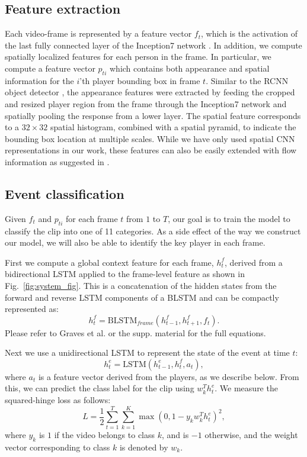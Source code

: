 \subsection{Feature extraction}
\label{sec:feature_extraction}
Each video-frame is represented by a feature vector $f_t$, which is the
activation of the last fully connected layer of the Inception7 network
\cite{Ioffe_arxiv15,Inception7}.  In addition, we compute spatially localized
features for each person in the frame. In particular, we compute a feature
vector $p_{ti}$ which contains both appearance and spatial information for the
$i$'th player bounding box in frame $t$.
Similar to the RCNN object
detector\cite{} , the appearance features were extracted by feeding the cropped
and resized player region from the frame through the Inception7 network and
spatially pooling the response from a lower layer. The spatial feature
corresponds to a $32\times 32$ spatial histogram, combined with a spatial pyramid, to
indicate the bounding box location at multiple scales.
While we have only used spatial CNN representations in our
work, these features can also be easily extended with flow information as
suggested in \cite{Simonyan_NIPS14}.

\subsection{Event classification}

Given $f_t$ and $p_{ti}$ for each frame $t$ from $1$ to $T$, our goal
is to train the model to classify the clip into one of 11 categories. As a side
effect of the way we construct our model, we will also be able to identify the
key player in each frame.

First we compute a global context feature for each frame, $h_t^f$, derived from
a bidirectional LSTM applied to the frame-level feature as shown in Fig.~\ref{fig:system_fig}. 
This is a concatenation of the hidden states from the forward and reverse LSTM
components of a BLSTM and can be compactly represented as:
\[
  h_t^f = \mbox{BLSTM}_{frame}(h_{t-1}^f, h_{t+1}^f, f_t).
\]Please refer to Graves et al. \cite{Graves_2013} or the supp. material
for the full equations.

Next we use  a unidirectional LSTM to represent the state of the
event at time $t$:
\begin{equation}
  \label{eq:event_lstm}
h_t^e = \mbox{LSTM}(h_{t-1}^e, h_t^f, a_t),
\end{equation}
where $a_t$ is a feature vector derived from the players, as we
describe below.
From this, we can predict the class label for the clip using $w_k^T
h_t^e$. We measure the squared-hinge loss as follows:
\begin{equation}
  L =   \frac{1}{2} \sum_{t=1}^T \sum_{k = 1}^K \max (0, 1 - y_k w_k^T h^e_t)^2,
\end{equation} 
where $y_k$ is $1$ if the video belongs to class $k$,
and is $-1$ otherwise, and the weight vector corresponding to
class $k$ is denoted by $w_k$.

